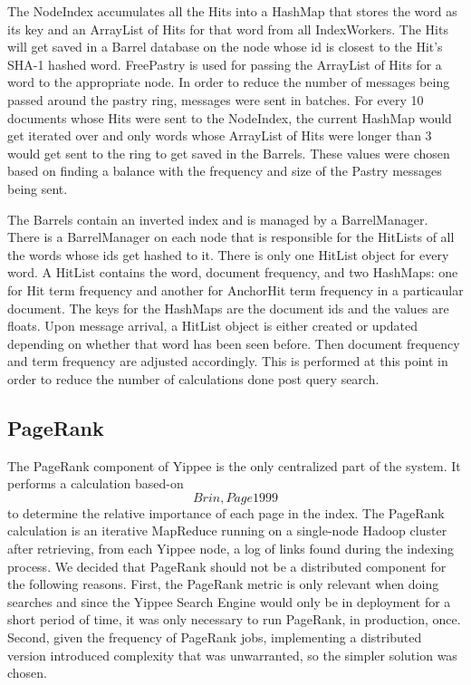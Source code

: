 \documentclass[11pt, letterpaper, oneside, twocolumn]{article}
\begin{document}
The NodeIndex accumulates all the Hits into a HashMap that stores the word as its key and an ArrayList of Hits for that word from all IndexWorkers. 
The Hits will get saved in a Barrel database on the node whose id is closest to the Hit’s SHA-1 hashed word. 
FreePastry is used for passing the ArrayList of Hits for a word to the appropriate node. 
In order to reduce the number of messages being passed around the pastry ring, messages were sent in batches. 
For every 10 documents whose Hits were sent to the NodeIndex, the current HashMap would get iterated over and only words whose ArrayList of Hits were longer than 3 would get sent to the ring to get saved in the Barrels. 
These values were chosen based on finding a balance with the frequency and size of the Pastry messages being sent. 


The Barrels contain an inverted index and is managed by a BarrelManager. 
There is a BarrelManager on each node that is responsible for the HitLists of all the words whose ids get hashed to it. There is only one HitList object for every word. 
A HitList contains the word, document frequency, and two HashMaps: one for Hit term frequency and another for AnchorHit term frequency in a particaular document. 
The keys for the HashMaps are the document ids and the values are floats. 
Upon message arrival, a HitList object is either created or updated depending on whether that word has been seen before. 
Then document frequency and term frequency are adjusted accordingly. 
This is performed at this point in order to reduce the number of calculations done post query search.  

\subsection{PageRank}

The PageRank component of Yippee is the only centralized part of the system.
It performs a calculation based-on \[Brin, Page 1999\]\cite{pagerank} to determine the relative importance of each page in the index.
The PageRank calculation is an iterative MapReduce running on a single-node Hadoop cluster after retrieving, from each Yippee node, a log of links found during the indexing process.
We decided that PageRank should not be a distributed component for the following reasons. 
First, the PageRank metric is only relevant when doing searches and since the Yippee Search Engine would only be in deployment for a short period of time, it was only necessary to run PageRank, in production, once.
Second, given the frequency of PageRank jobs, implementing a distributed version introduced complexity that was unwarranted, so the simpler solution was chosen.
\end{document}
